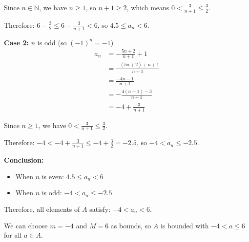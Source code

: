 \documentclass[12pt,a4paper]{article}
\theoremstyle{definition}
\theoremstyle{remark}
\begin{document}
Since $n \in \mathbb{N}$, we have $n \geq 1$, so $n+1 \geq 2$, which means $0 < \frac{3}{n+1} \leq \frac{3}{2}$.

Therefore: $6 - \frac{3}{2} \leq 6 - \frac{3}{n+1} < 6$, so $4.5 \leq a_n < 6$.

\textbf{Case 2:} $n$ is odd (so $(-1)^n = -1$)
\begin{align}
a_n &= -\frac{5n + 2}{n+1} + 1\\
&= \frac{-(5n + 2) + n + 1}{n+1}\\
&= \frac{-4n - 1}{n+1}\\
&= -\frac{4(n+1) - 3}{n+1}\\
&= -4 + \frac{3}{n+1}
\end{align}

Since $n \geq 1$, we have $0 < \frac{3}{n+1} \leq \frac{3}{2}$.

Therefore: $-4 < -4 + \frac{3}{n+1} \leq -4 + \frac{3}{2} = -2.5$, so $-4 < a_n \leq -2.5$.

\textbf{Conclusion:}
\begin{itemize}
\item When $n$ is even: $4.5 \leq a_n < 6$
\item When $n$ is odd: $-4 < a_n \leq -2.5$
\end{itemize}

Therefore, all elements of $A$ satisfy: $-4 < a_n < 6$.

We can choose $m = -4$ and $M = 6$ as bounds, so $A$ is bounded with $-4 < a \leq 6$ for all $a \in A$.
\end{document}

